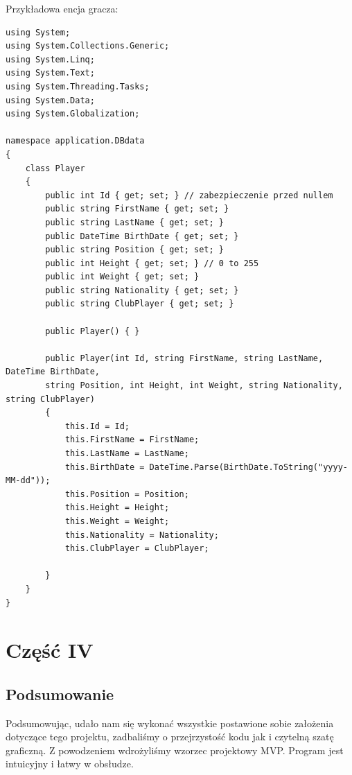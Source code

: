 \documentclass[12pt,a4paper]{article}
\begin{document}
    Przykładowa encja gracza:
    \begin{verbatim}
using System;
using System.Collections.Generic;
using System.Linq;
using System.Text;
using System.Threading.Tasks;
using System.Data;
using System.Globalization;

namespace application.DBdata
{
    class Player
    {
        public int Id { get; set; } // zabezpieczenie przed nullem
        public string FirstName { get; set; }
        public string LastName { get; set; }
        public DateTime BirthDate { get; set; }
        public string Position { get; set; }
        public int Height { get; set; } // 0 to 255
        public int Weight { get; set; }
        public string Nationality { get; set; }
        public string ClubPlayer { get; set; }

        public Player() { }

        public Player(int Id, string FirstName, string LastName, DateTime BirthDate,
        string Position, int Height, int Weight, string Nationality, string ClubPlayer)
        {
            this.Id = Id;
            this.FirstName = FirstName;
            this.LastName = LastName;
            this.BirthDate = DateTime.Parse(BirthDate.ToString("yyyy-MM-dd"));
            this.Position = Position;
            this.Height = Height;
            this.Weight = Weight;
            this.Nationality = Nationality;
            this.ClubPlayer = ClubPlayer;

        }
    }
}
    \end{verbatim}{}

    \section{Część IV}
    \subsection{Podsumowanie}
        Podsumowując, udało nam się wykonać wszystkie postawione sobie założenia dotyczące tego projektu, zadbaliśmy o przejrzystość kodu jak i czytelną szatę graficzną. Z powodzeniem wdrożyliśmy wzorzec projektowy MVP. Program jest intuicyjny i łatwy w obsłudze.
\end{document}
